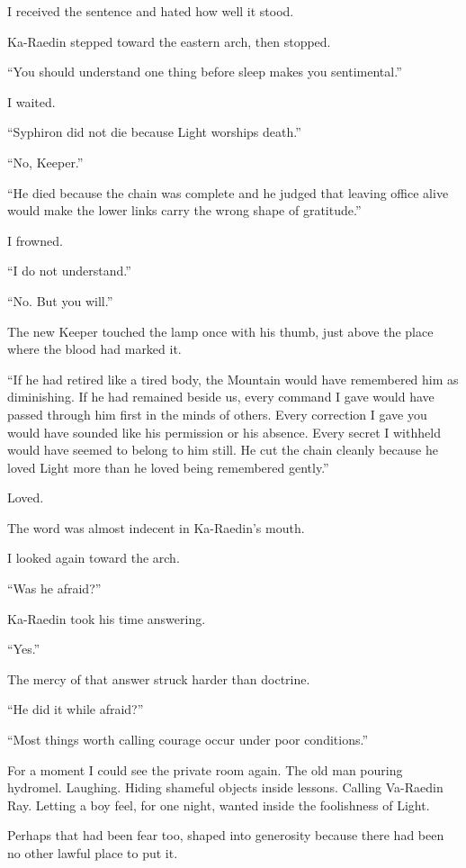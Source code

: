 I received the sentence and hated how well it stood.\par
Ka-Raedin stepped toward the eastern arch, then stopped.\par
``You should understand one thing before sleep makes you sentimental.''\par
I waited.\par
``Syphiron did not die because Light worships death.''\par
``No, Keeper.''\par
``He died because the chain was complete and he judged that leaving office alive would make the lower links carry the wrong shape of gratitude.''\par
I frowned.\par
``I do not understand.''\par
``No.
But you will.''\par
The new Keeper touched the lamp once with his thumb, just above the place where the blood had marked it.\par
``If he had retired like a tired body, the Mountain would have remembered him as diminishing.
If he had remained beside us, every command I gave would have passed through him first in the minds of others.
Every correction I gave you would have sounded like his permission or his absence.
Every secret I withheld would have seemed to belong to him still.
He cut the chain cleanly because he loved Light more than he loved being remembered gently.''\par
Loved.\par
The word was almost indecent in Ka-Raedin's mouth.\par
I looked again toward the arch.\par
``Was he afraid?''\par
Ka-Raedin took his time answering.\par
``Yes.''\par
The mercy of that answer struck harder than doctrine.\par
``He did it while afraid?''\par
``Most things worth calling courage occur under poor conditions.''\par
For a moment I could see the private room again.
The old man pouring hydromel.
Laughing.
Hiding shameful objects inside lessons.
Calling Va-Raedin Ray.
Letting a boy feel, for one night, wanted inside the foolishness of Light.\par
Perhaps that had been fear too, shaped into generosity because there had been no other lawful place to put it.\par

